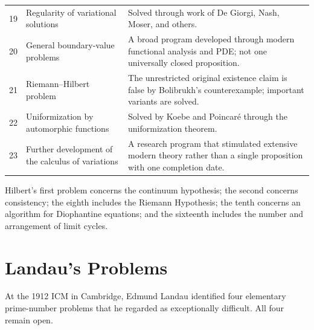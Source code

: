 {\begin{longtable}{@{}L{0.06\textwidth}L{0.31\textwidth}L{0.55\textwidth}@{}}
        19
        & Regularity of variational solutions
        & Solved through work of De Giorgi, Nash, Moser, and others. \\

        20
        & General boundary-value problems
        & A broad program developed through modern functional analysis and
          PDE; not one universally closed proposition. \\

        21
        & Riemann--Hilbert problem
        & The unrestricted original existence claim is false by Bolibrukh's
          counterexample; important variants are solved. \\

        22
        & Uniformization by automorphic functions
        & Solved by Koebe and Poincaré through the uniformization theorem. \\

        23
        & Further development of the calculus of variations
        & A research program that stimulated extensive modern theory rather
          than a single proposition with one completion date. \\
    \end{longtable}
    }

    \begin{fact}
        Hilbert's first problem concerns the continuum hypothesis; the second
        concerns consistency; the eighth includes the Riemann Hypothesis; the
        tenth concerns an algorithm for Diophantine equations; and the
        sixteenth includes the number and arrangement of limit cycles.
    \end{fact}

    \section*{Landau's Problems}

    At the 1912 ICM in Cambridge, Edmund Landau identified four elementary
    prime-number problems that he regarded as exceptionally difficult. All four
    remain open.

    \vspace{1em}

